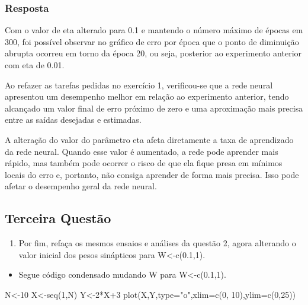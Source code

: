 \documentclass[
]{article}
\newenvironment{Shaded}{\begin{snugshade}}{\end{snugshade}}
\newcommand{\AttributeTok}[1]{\textcolor[rgb]{0.77,0.63,0.00}{#1}}
\newcommand{\DecValTok}[1]{\textcolor[rgb]{0.00,0.00,0.81}{#1}}
\newcommand{\FunctionTok}[1]{\textcolor[rgb]{0.00,0.00,0.00}{#1}}
\newcommand{\NormalTok}[1]{#1}
\newcommand{\OtherTok}[1]{\textcolor[rgb]{0.56,0.35,0.01}{#1}}
\newcommand{\SpecialCharTok}[1]{\textcolor[rgb]{0.00,0.00,0.00}{#1}}
\newcommand{\StringTok}[1]{\textcolor[rgb]{0.31,0.60,0.02}{#1}}
\providecommand{\tightlist}{%
  \setlength{\itemsep}{0pt}\setlength{\parskip}{0pt}}
\begin{document}
\hypertarget{resposta-1}{%
\subsubsection{Resposta}\label{resposta-1}}

Com o valor de eta alterado para 0.1 e mantendo o número máximo de
épocas em 300, foi possível observar no gráfico de erro por época que o
ponto de diminuição abrupta ocorreu em torno da época 20, ou seja,
posterior ao experimento anterior com eta de 0.01.

Ao refazer as tarefas pedidas no exercício 1, verificou-se que a rede
neural apresentou um desempenho melhor em relação ao experimento
anterior, tendo alcançado um valor final de erro próximo de zero e uma
aproximação mais precisa entre as saídas desejadas e estimadas.

A alteração do valor do parâmetro eta afeta diretamente a taxa de
aprendizado da rede neural. Quando esse valor é aumentado, a rede pode
aprender mais rápido, mas também pode ocorrer o risco de que ela fique
presa em mínimos locais do erro e, portanto, não consiga aprender de
forma mais precisa. Isso pode afetar o desempenho geral da rede neural.

\hypertarget{terceira-questuxe3o}{%
\subsection{Terceira Questão}\label{terceira-questuxe3o}}

\begin{enumerate}
\def\labelenumi{\arabic{enumi})}
\setcounter{enumi}{2}
\tightlist
\item
  Por fim, refaça os mesmos ensaios e análises da questão 2, agora
  alterando o valor inicial dos pesos sinápticos para
  W\textless-c(0.1,1).
\end{enumerate}

\begin{itemize}
\tightlist
\item
  Segue código condensado mudando W para W\textless-c(0.1,1).
\end{itemize}

\begin{Shaded}
\begin{Highlighting}[]
\NormalTok{N}\OtherTok{\textless{}{-}}\DecValTok{10}
\NormalTok{X}\OtherTok{\textless{}{-}}\FunctionTok{seq}\NormalTok{(}\DecValTok{1}\NormalTok{,N)}
\NormalTok{Y}\OtherTok{\textless{}{-}}\DecValTok{2}\SpecialCharTok{*}\NormalTok{X}\SpecialCharTok{+}\DecValTok{3}
\FunctionTok{plot}\NormalTok{(X,Y,}\AttributeTok{type=}\StringTok{"o"}\NormalTok{,}\AttributeTok{xlim=}\FunctionTok{c}\NormalTok{(}\DecValTok{0}\NormalTok{, }\DecValTok{10}\NormalTok{),}\AttributeTok{ylim=}\FunctionTok{c}\NormalTok{(}\DecValTok{0}\NormalTok{,}\DecValTok{25}\NormalTok{))}
\end{Highlighting}
\end{Shaded}
\end{document}
